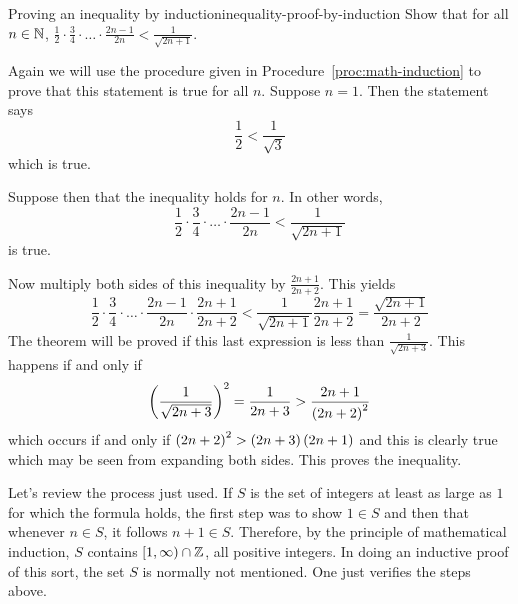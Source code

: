\begin{example}{Proving an inequality by induction}{inequality-proof-by-induction}
Show that for all $n\in \mathbb{N}$, $\displaystyle \frac{1}{2}\cdot 
\displaystyle \frac{3}{4}\cdot\ldots\cdot\displaystyle \frac{2n-1}{2n}<\displaystyle
\frac{1}{\sqrt{2n+1}}$.
\end{example}

\begin{solution}
Again we will use the procedure given in Procedure~\ref{proc:math-induction} to prove that this statement is true for all $n$.
Suppose $n=1$. Then the statement says 
\begin{equation*}
\frac{1}{2}< \frac{1}{\sqrt{3}}
\end{equation*}
 which is true. 

Suppose then that
the inequality holds for $n$. In other words, 
\begin{equation*}
 \frac{1}{2}\cdot \frac{3}{4}\cdot\ldots\cdot \frac{2n-1}{2n} < \frac{1}{\sqrt{2n+1}}
\end{equation*}
is true.

Now multiply both sides of this inequality by $\frac{2n+1}{2n+2}$.
This yields
\begin{equation*}
\frac{1}{2}\cdot \frac{3}{4}\cdot\ldots\cdot \frac{2n-1}{2n}\cdot \frac{2n+1}{2n+2}<
\frac{1}{\sqrt{2n+1}}\frac{2n+1}{2n+2}=\frac{\sqrt{2n+1}}{2n+2}
\end{equation*}
The theorem will be proved if this last expression is less than $
\displaystyle\frac{1}{\sqrt{2n+3}}$. This happens if and only if
\begin{equation*}
\left(\frac{1}{\sqrt{2n+3}}\right) ^{2}=\frac{1}{2n+3}>\frac{2n+1}{\left(
2n+2\right) ^{2}}
\end{equation*}
which occurs if and only if $\left(2n+2\right) ^{2}>\left(2n+3\right)
\left(2n+1\right) $ and this is clearly true which may be seen from
expanding both sides. This proves the inequality.
\end{solution}

Let's review the process just used. If $S$ is the set of integers at least as
large as $1$ for which the formula holds, the first step was to show $1\in S$
and then that whenever $n\in S$, it follows $n+1\in S$. Therefore, by the
principle of mathematical induction, $S$ contains $[1,\infty )\cap \mathbb{Z}
$, all positive integers. In doing an inductive proof of this sort, the set $
S$ is normally not mentioned. One just verifies the steps above. 
